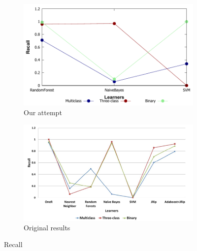\begin{figure}[H]
    \centering
    \begin{subfigure}[t]{0.5\textwidth}
        \includegraphics[width=\linewidth]{images/weka_recall}
        \caption{Our attempt}
    \end{subfigure}%
    \begin{subfigure}[t]{0.5\textwidth}
        \includegraphics[width=\linewidth]{images/weka_recall_cite.png}
        \caption{Original results \cite{borges_hink_machine_2014-1}}
    \end{subfigure}
    \caption{Recall}
    \label{fig:weka_recall}
\end{figure}

